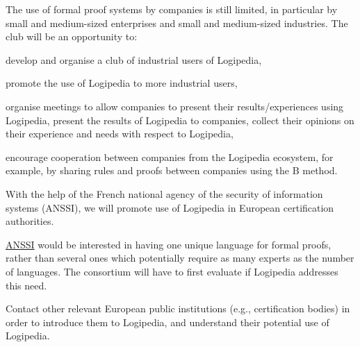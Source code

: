 \begin{workpackage}[id=dissemination,type=MGT,wphases=1-48,
  short={Dissemination},
  title={Dissemination, communication and exploitation},
  lead=Lie,LieRM=3,InrRM=6,BirRM=4,CleRM=2,ImtRM=2,StrRM=2,ZibRM=14,EduRM=12]
\begin{tasklist}
  \begin{task}[id=industrial-club,
    title=Expanding the use of Logipedia in the industry,
    shorttitle=Industry, lead=Cle,CleRM=2,wphases=1-48!.05] The use of
    formal proof systems by companies is still limited, in particular
    by small and medium-sized enterprises and small and medium-sized
    industries. The club will be an opportunity to:
    \begin{compactitem}
    \item develop and organise a club of industrial users of Logipedia,
    \item promote the use of Logipedia to more industrial users,
    \item organise meetings to allow companies to present their results/experiences using Logipedia, present the results of Logipedia to companies, collect their opinions on their experience and needs with respect to Logipedia,
    \item encourage cooperation between companies from the Logipedia
      ecosystem, for example, by sharing rules and proofs between companies using the B method.
    \end{compactitem}
  \end{task}

  \begin{task}[id=certifiers-club,
      title=Promoting the use of Logipedia by certification authorities,
      shorttitle=Certif.,
      lead=Imt,ImtRM=2,wphases=1-48!.05]
    With the help of the French national agency of the security of
    information systems (ANSSI), we will promote use of Logipedia in
    European certification authorities.
    \begin{compactitem}
    \item \href{https://www.ssi.gouv.fr/}{ANSSI} would be interested in having one unique language for formal
proofs, rather than several ones which potentially require as many
experts as the number of languages. The consortium will have to first
evaluate if Logipedia addresses 
this need.
\item Contact other relevant European public institutions
(e.g., certification bodies) in order to introduce them to Logipedia,
and understand their potential use of Logipedia.
    \end{compactitem}
  \end{task}


\end{tasklist}
\end{workpackage}
